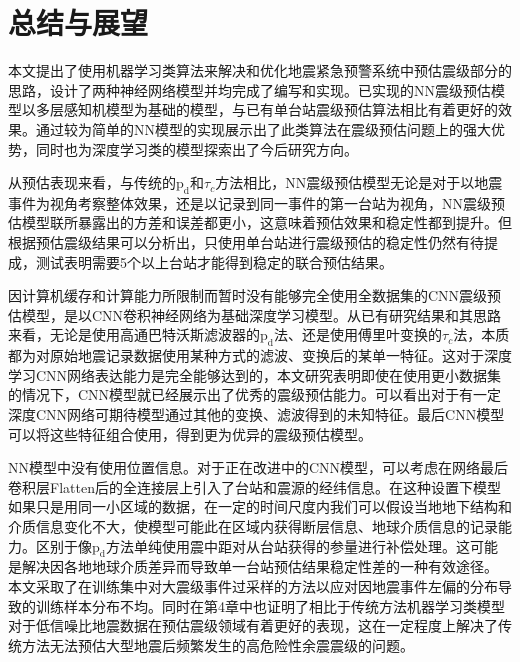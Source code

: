\chapter{总结与展望}
\indent 本文提出了使用机器学习类算法来解决和优化地震紧急预警系统中预估震级部分的思路，设计了两种神经网络模型并均完成了编写和实现。已实现的NN震级预估模型以多层感知机模型为基础的模型，与已有单台站震级预估算法相比有着更好的效果。通过较为简单的NN模型的实现展示出了此类算法在震级预估问题上的强大优势，同时也为深度学习类的模型探索出了今后研究方向。

\indent 从预估表现来看，与传统的$\mathrm{p}_{\mathrm{d}}$和$\tau_{c}$方法相比，NN震级预估模型无论是对于以地震事件为视角考察整体效果，还是以记录到同一事件的第一台站为视角，NN震级预估模型联所暴露出的方差和误差都更小，这意味着预估效果和稳定性都到提升。但根据预估震级结果可以分析出，只使用单台站进行震级预估的稳定性仍然有待提成，测试表明需要5个以上台站才能得到稳定的联合预估结果。

\indent 因计算机缓存和计算能力所限制而暂时没有能够完全使用全数据集的CNN震级预估模型，是以CNN卷积神经网络为基础深度学习模型。从已有研究结果和其思路来看，无论是使用高通巴特沃斯滤波器的$\mathrm{p}_{\mathrm{d}}$法、还是使用傅里叶变换的$\tau_{c}$法，本质都为对原始地震记录数据使用某种方式的滤波、变换后的某单一特征。这对于深度学习CNN网络表达能力是完全能够达到的，本文研究表明即使在使用更小数据集的情况下，CNN模型就已经展示出了优秀的震级预估能力。可以看出对于有一定深度CNN网络可期待模型通过其他的变换、滤波得到的未知特征。最后CNN模型可以将这些特征组合使用，得到更为优异的震级预估模型。

\indent NN模型中没有使用位置信息。对于正在改进中的CNN模型，可以考虑在网络最后卷积层Flatten后的全连接层上引入了台站和震源的经纬信息。在这种设置下模型如果只是用同一小区域的数据，在一定的时间尺度内我们可以假设当地地下结构和介质信息变化不大，使模型可能此在区域内获得断层信息、地球介质信息的记录能力。区别于像$\mathrm{p}_{\mathrm{d}}$方法单纯使用震中距对从台站获得的参量进行补偿处理。这可能是解决因各地地球介质差异而导致单一台站预估结果稳定性差的一种有效途径。\\

\indent 本文采取了在训练集中对大震级事件过采样的方法以应对因地震事件左偏的分布导致的训练样本分布不均。同时在第4章中也证明了相比于传统方法机器学习类模型对于低信噪比地震数据在预估震级领域有着更好的表现，这在一定程度上解决了传统方法无法预估大型地震后频繁发生的高危险性余震震级的问题。\\
